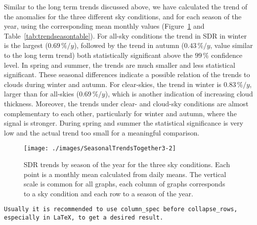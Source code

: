 \documentclass[An awesome
journal,,,moreauthors,pdftex]{Definitions/mdpi}
\begin{document}
Similar to the long term trends discussed above, we have calculated the
trend of the anomalies for the three different sky conditions, and for
each season of the year, using the corresponding mean monthly values
(Figure~\ref{fig:seasonalALL} and Table~\ref{tab:trendseasontable}). For
all-sky conditions the trend in SDR in winter is the largest
(\(0.69\,\%/y\)), followed by the trend in autumn (\(0.43\,\%/y\), value
similar to the long term trend) both statistically significant above the
\(99\,\%\) confidence level. In spring and summer, the trends are much
smaller and less statistical significant. These seasonal differences
indicate a possible relation of the trends to clouds during winter and
autumn. For clear-skies, the trend in winter is \(0.83\,\%/y\), larger
than for all-skies (\(0.69\,\%/y\)), which is another indication of
increasing cloud thickness. Moreover, the trends under clear- and
cloud-sky conditions are almost complementary to each other,
particularly for winter and autumn, where the signal is stronger. During
spring and summer the statistical significance is very low and the
actual trend too small for a meaningful comparison.

\begin{figure}[h!]

{\centering \texttt{[image: ./images/SeasonalTrendsTogether3-2]} 

}

\caption{SDR trends by season of the year for the three sky conditions. Each point is a monthly mean calculated from daily means. The vertical scale is common for all graphs, each column of graphs corresponds to a sky condition and each row to a season of the year.}\label{fig:seasonalALL}
\end{figure}

\begin{verbatim}
Usually it is recommended to use column_spec before collapse_rows, especially in LaTeX, to get a desired result. 
\end{verbatim}
\end{document}
